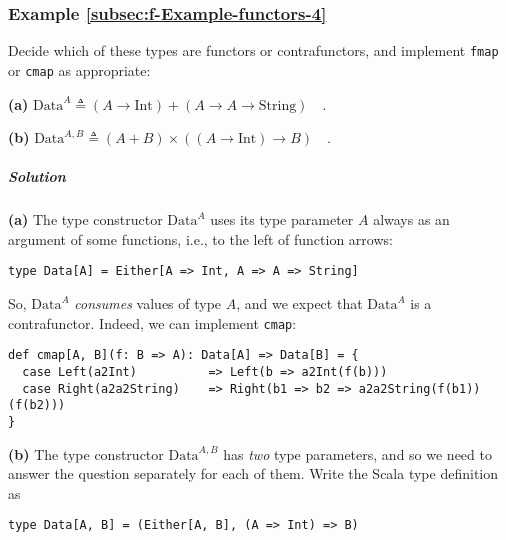 \subsubsection{Example \label{subsec:f-Example-functors-4}\ref{subsec:f-Example-functors-4}}

Decide which of these types are functors or contrafunctors, and implement
\lstinline!fmap! or \lstinline!cmap! as appropriate:

\textbf{(a)} $\text{Data}^{A}\triangleq\left(A\rightarrow\text{Int}\right)+(A\rightarrow A\rightarrow\text{String})\quad.$ 

\textbf{(b)} $\text{Data}^{A,B}\triangleq\left(A+B\right)\times\left(\left(A\rightarrow\text{Int}\right)\rightarrow B\right)\quad.$

\subparagraph{Solution}

\textbf{(a)} The type constructor $\text{Data}^{A}$ uses its type
parameter $A$ always as an argument of some functions, i.e., to the
left of function arrows:
\begin{lstlisting}
type Data[A] = Either[A => Int, A => A => String]
\end{lstlisting}
So, $\text{Data}^{A}$ \emph{consumes} values of type $A$, and we
expect that $\text{Data}^{A}$ is a contrafunctor. Indeed, we can
implement \lstinline!cmap!:
\begin{lstlisting}
def cmap[A, B](f: B => A): Data[A] => Data[B] = {
  case Left(a2Int)          => Left(b => a2Int(f(b)))
  case Right(a2a2String)    => Right(b1 => b2 => a2a2String(f(b1))(f(b2)))
}
\end{lstlisting}

\textbf{(b)} The type constructor $\text{Data}^{A,B}$ has \emph{two}
type parameters, and so we need to answer the question separately
for each of them. Write the Scala type definition as
\begin{lstlisting}
type Data[A, B] = (Either[A, B], (A => Int) => B)
\end{lstlisting}

